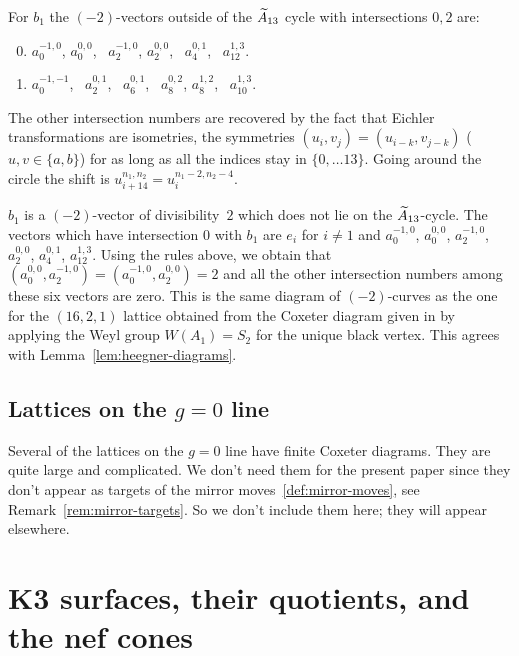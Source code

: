 \documentclass{amsart}
\begin{document}
For $b_1$ the $(-2)$-vectors outside of the ${\widetilde A}_{13}$ cycle with
intersections $0,2$ are: 

\begin{enumerate}
  \setcounter{enumi}{-1}
\item $a_0^{-1,0}$, $a_0^{0,0}$, \ 
  $a_2^{-1,0}$, $a_2^{0,0}$, \ 
  $a_4^{0,1}$, \ 
  $a_{12}^{1,3}$.  
  \setcounter{enumi}{1}
\item $a_0^{-1,-1}$, \ 
  $a_2^{0,1}$, \ 
  $a_6^{0,1}$, \ 
  $a_8^{0,2}$, $a_8^{1,2}$, \ 
  $a_{10}^{1,3}$.  
\end{enumerate}

The other intersection numbers are recovered by the fact that Eichler
transformations are isometries, the symmetries
$(u_i, v_j) = (u_{i-k}, v_{j-k})$ ($u,v\in \{a,b\}$) for as long as
all the indices stay in $\{0,\dotsc 13\}$. Going around the circle the
shift is $u_{i+14}^{n_1,n_2} = u_i^{n_1-2,n_2-4}$.

\begin{example}
  $b_1$ is a $(-2)$-vector of divisibility~$2$ which does not lie on
  the ${\widetilde A}_{13}$-cycle.
  The vectors which have intersection $0$ with $b_1$ are $e_i$ for
  $i\ne1$ and $a_0^{-1,0}$, $a_0^{0,0}$, $a_2^{-1,0}$, $a_2^{0,0}$,
  $a_4^{0,1}$, $a_{12}^{1,3}$. Using the rules above, we obtain that
  $(a_0^{0,0}, a_2^{-1,0}) = (a_0^{-1,0}, a_2^{0,0}) =2$ and all the
  other intersection numbers among these six vectors are zero. This is
  the same diagram of $(-2)$-curves as the one for the $(16,2,1)$
  lattice obtained from the Coxeter diagram given in
  \cite[Table~1]{alexeev2006del-pezzo} by applying the Weyl group
  $W(A_1)=S_2$ for the unique black vertex.
  This agrees with Lemma~\ref{lem:heegner-diagrams}.
\end{example}

\subsection{Lattices on the $g=0$ line}
\label{sec:vinberg-g=0}

Several of the lattices on the $g=0$ line have finite Coxeter
diagrams. They are quite large and complicated. We don't need them for
the present paper since they don't appear as targets of the mirror
moves~\ref{def:mirror-moves}, see Remark~\ref{rem:mirror-targets}. So
we don't include them here; they will appear elsewhere.


\section{K3 surfaces, their quotients,  and the nef cones}
\label{sec:Y-nef-cone}
\end{document}

